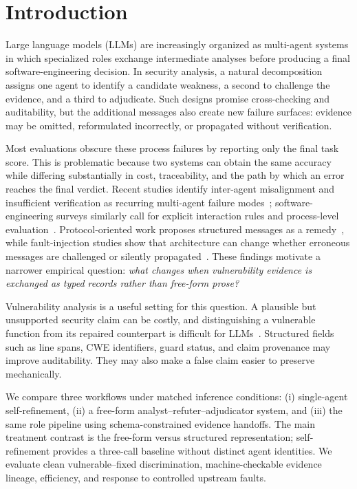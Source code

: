 \section{Introduction}

Large language models (LLMs) are increasingly organized as multi-agent systems in which specialized roles exchange intermediate analyses before producing a final software-engineering decision. In security analysis, a natural decomposition assigns one agent to identify a candidate weakness, a second to challenge the evidence, and a third to adjudicate. Such designs promise cross-checking and auditability, but the additional messages also create new failure surfaces: evidence may be omitted, reformulated incorrectly, or propagated without verification.

Most evaluations obscure these process failures by reporting only the final task score. This is problematic because two systems can obtain the same accuracy while differing substantially in cost, traceability, and the path by which an error reaches the final verdict. Recent studies identify inter-agent misalignment and insufficient verification as recurring multi-agent failure modes~\cite{cemri2025mast}; software-engineering surveys similarly call for explicit interaction rules and process-level evaluation~\cite{he2025road}. Protocol-oriented work proposes structured messages as a remedy~\cite{mao2025semap}, while fault-injection studies show that architecture can change whether erroneous messages are challenged or silently propagated~\cite{huang2025resilience,jia2026masfire}. These findings motivate a narrower empirical question: \emph{what changes when vulnerability evidence is exchanged as typed records rather than free-form prose?}

Vulnerability analysis is a useful setting for this question. A plausible but unsupported security claim can be costly, and distinguishing a vulnerable function from its repaired counterpart is difficult for LLMs~\cite{ahmed2025secvuleval,wang2026vulagent}. Structured fields such as line spans, CWE identifiers, guard status, and claim provenance may improve auditability. They may also make a false claim easier to preserve mechanically.

We compare three workflows under matched inference conditions: (i) single-agent self-refinement, (ii) a free-form analyst--refuter--adjudicator system, and (iii) the same role pipeline using schema-constrained evidence handoffs. The main treatment contrast is the free-form versus structured representation; self-refinement provides a three-call baseline without distinct agent identities. We evaluate clean vulnerable--fixed discrimination, machine-checkable evidence lineage, efficiency, and response to controlled upstream faults.

